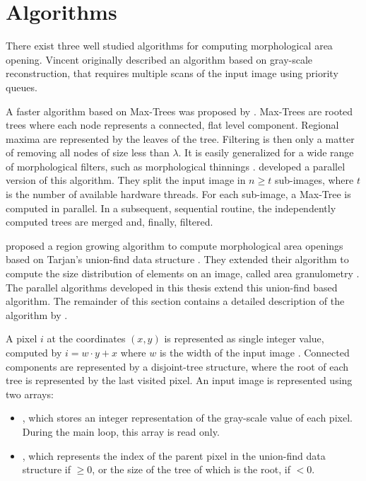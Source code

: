 \section{Algorithms}
\label{sec:morphology-algorithm}

There exist three well studied algorithms for computing morphological area
opening. Vincent \cite{Vincent1994Morphological} originally described an
algorithm based on gray-scale reconstruction, that requires multiple scans of
the input image using priority queues.

A faster algorithm based on Max-Trees was proposed by
\citet{Salembier1998Antiextensive}. Max-Trees are rooted trees where each node
represents a connected, flat level component. Regional maxima are represented by
the leaves of the tree. Filtering is then only a matter of removing all nodes of
size less than $\lambda$. It is easily generalized for a wide range of
morphological filters, such as morphological thinnings
\cite{Breen1996Attribute}. \citet{Wilkinson2008Concurrent} developed a parallel
version of this algorithm. They split the input image in $n \geq t$ sub-images,
where $t$ is the number of available hardware threads. For each sub-image, a
Max-Tree is computed in parallel. In a subsequent, sequential routine, the
independently computed trees are merged and, finally, filtered.

\citet{Meijster2002Comparison} proposed a region growing algorithm to compute
morphological area openings based on Tarjan's union-find data structure
\cite{Tarjan1983Data}. They extended their algorithm to compute the size
distribution of elements on an image, called area granulometry
\cite{Meijster2001Fast}. The parallel algorithms developed in this thesis extend
this union-find based algorithm. The remainder of this section contains a
detailed description of the algorithm by \citet{Meijster2002Comparison}.

A pixel $i$ at the coordinates $(x, y)$ is represented as single integer value,
computed by $i = w \cdot y + x$ where $w$ is the width of the input image
\cite{Meijster2002Comparison}. Connected components are represented by a
disjoint-tree structure, where the root of each tree is represented by the last
visited pixel. An input image is represented using two arrays:

\begin{itemize}
\item {}, which stores an integer representation of the
  gray-scale value of each pixel. During the main loop, this array is read only.

\item {}, which represents the index of the parent pixel in the
  union-find data structure if  $\geq 0$, or the size of
  the tree of which  is the root, if  $< 0$.
\end{itemize}

